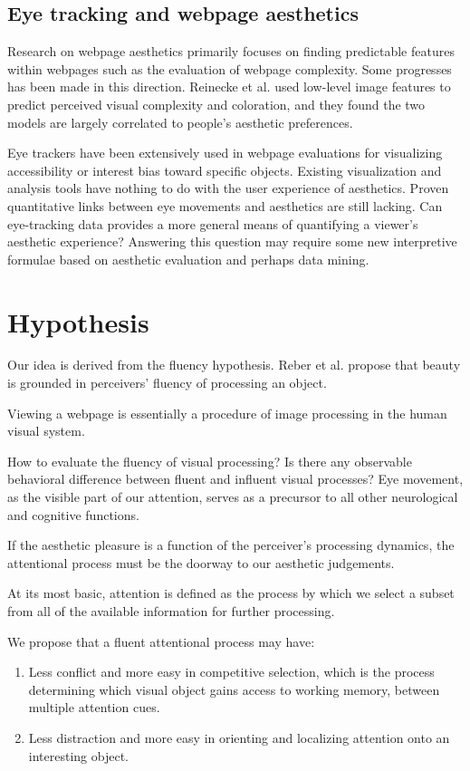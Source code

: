 \subsection{Eye tracking and webpage aesthetics}
Research on webpage aesthetics primarily focuses on finding predictable features within webpages such as the evaluation of webpage complexity\cite{Deng2010}. Some progresses has been made in this direction\cite{Ivory}\cite{Zheng}. Reinecke et al.\cite{Reinecke} used low-level image features to predict perceived visual complexity and coloration, and they found the two models are largely correlated to people's aesthetic preferences.

Eye trackers have been extensively used in webpage evaluations for visualizing accessibility or interest bias toward specific objects. Existing visualization and analysis tools have nothing to do with the user experience of aesthetics. Proven quantitative links between eye movements and aesthetics are still lacking\cite{Santella}. Can eye-tracking data provides a more general means of quantifying a viewer's aesthetic experience? Answering this question may require some new interpretive formulae based on aesthetic evaluation and perhaps data mining.

\section{Hypothesis}
\label{sec:hyp}
Our idea is derived from the fluency hypothesis. Reber et al.\cite{Reber2004} propose that beauty is grounded in perceivers' fluency of processing an object.

Viewing a webpage is essentially a procedure of image processing in the human visual system.

How to evaluate the fluency of visual processing? Is there any observable behavioral difference between fluent and influent visual processes? Eye movement, as the visible part of our attention, serves as a precursor to all other neurological and cognitive functions.

If the aesthetic pleasure is a function of the perceiver's processing dynamics\cite{Reber2004}, the attentional process must be the doorway to our aesthetic judgements.

At its most basic, attention is defined as the process by which we select a subset from all of the available information for further processing\cite{Eriksen1972}.

We propose that a fluent attentional process may have:
\begin{enumerate}
  \item Less conflict and more easy in competitive selection, which is the process determining which visual object gains access to working memory, between multiple attention cues.
  \item Less distraction and more easy in orienting and localizing attention onto an interesting object.
\end{enumerate}

